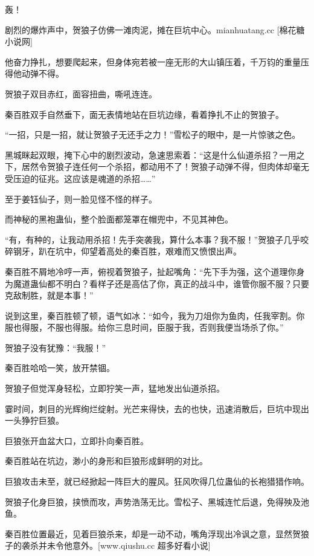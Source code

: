 
\begin{this_body}

轰！

剧烈的爆炸声中，贺狼子仿佛一滩肉泥，摊在巨坑中心。mianhuatang.cc [棉花糖小说网]

他奋力挣扎，想要爬起来，但身体宛若被一座无形的大山镇压着，千万钧的重量压得他动弹不得。

贺狼子双目赤红，面容扭曲，嘶吼连连。

秦百胜双手自然垂下，面无表情地站在巨坑边缘，看着挣扎不止的贺狼子。

“一招，只是一招，就让贺狼子无还手之力！”雪松子的眼中，是一片惊骇之色。

黑城眯起双眼，掩下心中的剧烈波动，急速思索着：“这是什么仙道杀招？一用之下，居然令贺狼子连任何一个杀招，都动用不了！贺狼子动弹不得，但肉体却毫无受压迫的征兆。这应该是魂道的杀招……”

至于姜钰仙子，则一脸见怪不怪的样子。

而神秘的黑袍蛊仙，整个脸面都笼罩在帽兜中，不见其神色。

“有，有种的，让我动用杀招！先手突袭我，算什么本事？我不服！”贺狼子几乎咬碎钢牙，趴在坑中，仰望着高处的秦百胜，艰难而又愤恨出声。

秦百胜不屑地冷哼一声，俯视着贺狼子，扯起嘴角：“先下手为强，这个道理你身为魔道蛊仙都不明白？看样子还是高估了你，真正的战斗中，谁管你服不服？只要克敌制胜，就是本事！”

说到这里，秦百胜顿了顿，语气如冰：“如今，我为刀俎你为鱼肉，任我宰割。你服也得服，不服也得服。给你三息时间，臣服于我，否则我便当场杀了你。”

贺狼子没有犹豫：“我服！”

秦百胜哈哈一笑，放开禁锢。

贺狼子但觉浑身轻松，立即狞笑一声，猛地发出仙道杀招。

霎时间，刺目的光辉绚烂绽射。光芒来得快，去的也快，迅速消散后，巨坑中现出一头狰狞巨狼。

巨狼张开血盆大口，立即扑向秦百胜。

秦百胜站在坑边，渺小的身形和巨狼形成鲜明的对比。

巨狼攻击未至，就已经掀起一阵巨大的腥风。狂风吹得几位蛊仙的长袍猎猎作响。

贺狼子化身巨狼，挟愤而攻，声势浩荡无比。雪松子、黑城连忙后退，免得殃及池鱼。

秦百胜位置最近，见着巨狼杀来，却是一动不动，嘴角浮现出冷讽之意，显然贺狼子的袭杀并未令他意外。[www.qiushu.cc 超多好看小说]


\end{this_body}
